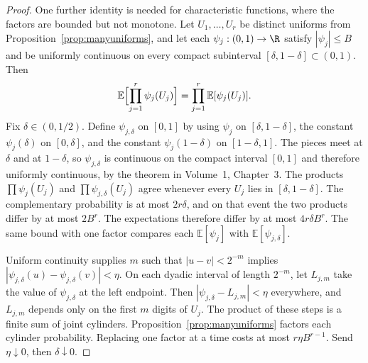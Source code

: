 \begin{proof}
One further identity is needed for characteristic functions, where the factors are bounded but not monotone. Let $U_1,\ldots,U_r$ be distinct uniforms from Proposition~\ref{prop:manyuniforms}, and let each $\psi_j:(0,1)\to\R$ satisfy $|\psi_j|\le B$ and be uniformly continuous on every compact subinterval $[\delta,1-\delta]\subset(0,1)$. Then
\[
 \mathbb E\Bigl[\prod_{j=1}^r\psi_j(U_j)\Bigr]=\prod_{j=1}^r\mathbb E[\psi_j(U_j)].
\]
Fix $\delta\in(0,1/2)$. Define $\psi_{j,\delta}$ on $[0,1]$ by using $\psi_j$ on $[\delta,1-\delta]$, the constant $\psi_j(\delta)$ on $[0,\delta]$, and the constant $\psi_j(1-\delta)$ on $[1-\delta,1]$. The pieces meet at $\delta$ and at $1-\delta$, so $\psi_{j,\delta}$ is continuous on the compact interval $[0,1]$ and therefore uniformly continuous, by the theorem in Volume~1, Chapter~3. The products $\prod\psi_j(U_j)$ and $\prod\psi_{j,\delta}(U_j)$ agree whenever every $U_j$ lies in $[\delta,1-\delta]$. The complementary probability is at most $2r\delta$, and on that event the two products differ by at most $2B^r$. The expectations therefore differ by at most $4r\delta B^r$. The same bound with one factor compares each $\mathbb E[\psi_j]$ with $\mathbb E[\psi_{j,\delta}]$.

Uniform continuity supplies $m$ such that $|u-v|<2^{-m}$ implies $|\psi_{j,\delta}(u)-\psi_{j,\delta}(v)|<\eta$. On each dyadic interval of length $2^{-m}$, let $L_{j,m}$ take the value of $\psi_{j,\delta}$ at the left endpoint. Then $|\psi_{j,\delta}-L_{j,m}|<\eta$ everywhere, and $L_{j,m}$ depends only on the first $m$ digits of $U_j$. The product of these steps is a finite sum of joint cylinders. Proposition~\ref{prop:manyuniforms} factors each cylinder probability. Replacing one factor at a time costs at most $r\eta B^{r-1}$. Send $\eta\downarrow0$, then $\delta\downarrow0$.
\end{proof}


